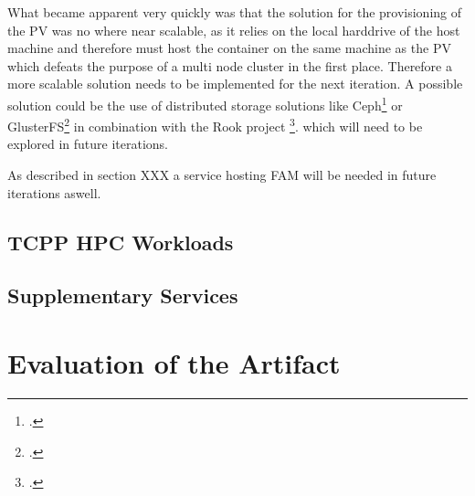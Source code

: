 What became apparent very quickly was that the solution for the provisioning of the \ac{PV} was no where near scalable,
as it relies on the local harddrive of the host machine and therefore must host the container on the same machine as the \ac{PV} which defeats the purpose of a multi node cluster in the first place.
Therefore a more scalable solution needs to be implemented for the next iteration.
A possible solution could be the use of distributed storage solutions like Ceph\footcite{CephIoHome} or GlusterFS\footcite{Gluster}  in combination with the Rook project \footcite{Rook}. 
which will need to be explored in future iterations.


As described in section XXX a service hosting \ac{FAM} will be needed in future iterations aswell.

\subsection{\ac{TCPP} HPC Workloads} 
\label{tcpp_hpc_workloads}

\subsection{Supplementary Services}



\newpage    


\section{Evaluation of the Artifact}

\newpage
